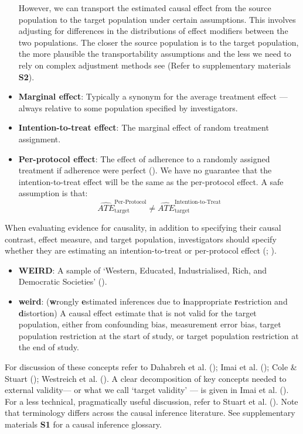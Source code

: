 \documentclass[
  single column]{article}
\begin{document}
\begin{itemize}
  However, we can transport the estimated causal effect from the source
  population to the target population under certain assumptions. This
  involves adjusting for differences in the distributions of effect
  modifiers between the two populations. The closer the source
  population is to the target population, the more plausible the
  transportability assumptions and the less we need to rely on complex
  adjustment methods see (Refer to supplementary materials \textbf{S2}).
\item
  \textbf{Marginal effect}: Typically a synonym for the average
  treatment effect --- always relative to some population specified by
  investigators.
\item
  \textbf{Intention-to-treat effect}: The marginal effect of random
  treatment assignment.
\item
  \textbf{Per-protocol effect}: The effect of adherence to a randomly
  assigned treatment if adherence were perfect
  (). We have no
  guarantee that the intention-to-treat effect will be the same as the
  per-protocol effect. A safe assumption is that: \[
  \widehat{ATE}_{\text{target}}^{\text{Per-Protocol}} \ne \widehat{ATE}_{\text{target}}^{\text{Intention-to-Treat}}
  \]
\end{itemize}

When evaluating evidence for causality, in addition to specifying their
causal contrast, effect measure, and target population, investigators
should specify whether they are estimating an intention-to-treat or
per-protocol effect (;
).

\begin{itemize}
\item
  \textbf{WEIRD}: A sample of `Western, Educated, Industrialised, Rich,
  and Democratic Societies' ().
\item
  \textbf{weird}: (\textbf{w}rongly \textbf{e}stimated inferences due to
  \textbf{i}nappropriate \textbf{r}estriction and \textbf{d}istortion) A
  causal effect estimate that is not valid for the target population,
  either from confounding bias, measurement error bias, target
  population restriction at the start of study, or target population
  restriction at the end of study.
\end{itemize}

For discussion of these concepts refer to Dahabreh et al.
(); Imai et al.
(); Cole \& Stuart
(); Westreich et al.
(). A clear
decomposition of key concepts needed to external validity--- or what we
call `target validity' --- is given in Imai et al.
(). For a less technical,
pragmatically useful discussion, refer to Stuart et al.
(). Note that terminology
differs across the causal inference literature. See supplementary
materials \textbf{S1} for a causal inference glossary.
\end{document}
